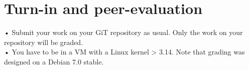 \documentclass{42-en}
\begin{document}
\chapter{Turn-in and peer-evaluation}

        • Submit your work on your GiT repository as usual. Only the work on your repository will be graded.\\
        \newline
        • You have to be in a VM with a Linux kernel > 3.14. Note that grading was designed on a Debian 7.0 stable.



\end{document}
